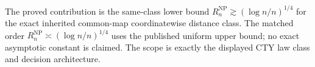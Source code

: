 The proved contribution is the same-class lower bound \(R_n^{\mathrm{NP}}\gtrsim(\log n/n)^{1/4}\) for the exact inherited common-map coordinatewise distance class.  The matched order \(R_n^{\mathrm{NP}}\asymp(\log n/n)^{1/4}\) uses the published uniform upper bound; no exact asymptotic constant is claimed.  The scope is exactly the displayed CTY law class and decision architecture.